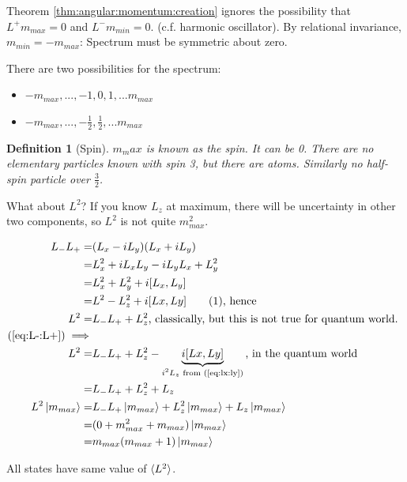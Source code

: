 \documentclass[]{article}
\newcommand\numberthis{\addtocounter{equation}{1}\tag{\theequation}}
\newtheorem{defn}[thm]{Definition}
\begin{document}
Theorem \ref{thm:angular:momentum:creation} ignores the possibility that $L^+m_{max}=0$ and $L^-m_{min}=0$. (c.f. harmonic oscillator). By relational invariance, $m_{min}=-m_{max}$: Spectrum must be symmetric about zero.

There are two possibilities for the spectrum:
\begin{itemize}
	\item $-m_{max},...,-1,0,1,...m_{max}$
	\item $-m_{max},...,-\frac{1}{2},\frac{1}{2},...m_{max}$
\end{itemize}

\begin{defn}[Spin]
	$m_max$ is known as the spin. It can be 0. There are no elementary particles known with spin 3, but there are atoms. Similarly no half-spin particle over $\frac{3}{2}$.
\end{defn}

What about $L^2$? If you know $L_z$ at maximum, there will be uncertainty in other two components, so $L^2$ is not quite $m_{max}^2$.

\begin{align*}
	L_- L_+ =& (L_x-iL_y)(L_x+iL_y)\\
	=& L_x^2 +i L_x L_y -i L_y L_x + L_y^2\\
	=& L_x^2 + L_y^2 + i[L_x,L_y]\\
	=& L^2 - L_z^2 + i[Lx,Ly] \numberthis \label{eq:L-:L+}\text{, hence}\\
	L^2 =& L_- L_+ + L_z^2 \text{, classically, but this is not true for quantum world. }\\
	(\ref{eq:L-:L+}) \implies& \\
	 L^2 =& L_- L_+ + L_z^2 -\underbrace{i[Lx,Ly]}_\text{$i^2L_z$ from (\ref{eq:lx:ly})}\text{, in the quantum world}\\
	 =& L_- L_+ + L_z^2 +L_z\\
	L^2 \ket{m_{max}}=& L_- L_+ \ket{m_{max}} + L_z^2 \ket{m_{max}} +L_z \ket{m_{max}}\\
	=& (0 +m_{max}^2 + m_{max})\ket{m_{max}} \\
	=& m_{max} (m_{max}+1)\ket{m_{max}}
\end{align*}

All states have same value of $\braket{L^2}$. 
\end{document}
